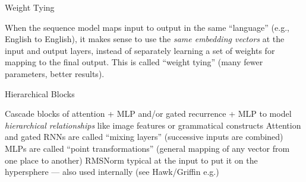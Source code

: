 \begin{slide}[\slideopts]{Weight Tying}

  When the sequence model maps input to output in the same ``language'' (e.g., English to English),
  it makes sense to use the \emph{same embedding vectors} at the input and output layers, instead
  of separately learning a set of weights for mapping to the final output.
  This is called ``weight tying'' (many fewer parameters, better results).

\end{slide}

\begin{slide}[\slideopts]{Hierarchical Blocks}
\begin{itemize}
  \mpitem Cascade blocks of attention + MLP and/or gated recurrence + MLP to model \emph{hierarchical relationships} like image features or grammatical constructs
  \mpitem Attention and gated RNNs are called ``mixing layers'' (successive inputs are combined)
  \mpitem MLPs are called ``point transformations'' (general mapping of any vector from one place to another)
  \mpitem RMSNorm typical at the input to put it on the hypersphere --- also used internally (see Hawk/Griffin e.g.)
\end{itemize}
\end{slide}








